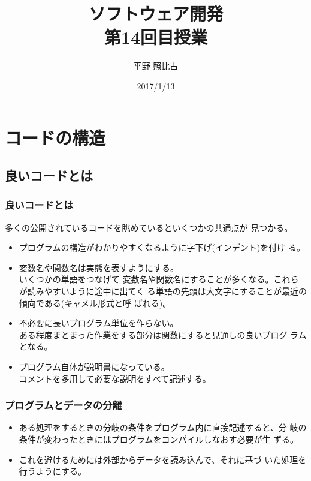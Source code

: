 
\title{ソフトウェア開発\\第14回目授業}
\author{平野 照比古}
\institute{}
\date{2017/1/13}
\newtheorem{Prob}{解説}
\newcommand{\Elm}[1]{\texttt{<#1>}}

\newcommand{\DOMM}{\texttt}
\newcommand{\Event}{\texttt}
\newcommand{\DOMP}{\texttt}
\newcommand{\DOM}{\texttt{DOM}}
\newcommand{\keyitem}{\relax}
\newcommand{\HTML}{HTML文書}

\frame{\maketitle}
\section{コードの構造}
\subsection{良いコードとは}
 \begin{frame}[containsverbatim]
  \frametitle{良いコードとは}
多くの公開されているコードを眺めているといくつかの共通点が
  見つかる。
\begin{itemize}
 \item プログラムの構造がわかりやすくなるように字下げ(インデント)を付け
			 る。
 \item 変数名や関数名は実態を表すようにする。\\いくつかの単語をつなげて
			 変数名や関数名にすることが多くなる。これらが読みやすいように途中に出てく
			 る単語の先頭は大文字にすることが最近の傾向である(キャメル形式と呼
			 ばれる)。
 \item 不必要に長いプログラム単位を作らない。\\
			 ある程度まとまった作業をする部分は関数にすると見通しの良いプログ
			 ラムとなる。
 \item プログラム自体が説明書になっている。\\
			 コメントを多用して必要な説明をすべて記述する。
\end{itemize}
 \end{frame}
 \begin{frame}[containsverbatim]
  \frametitle{プログラムとデータの分離}
  \begin{itemize}
   \item ある処理をするときの分岐の条件をプログラム内に直接記述すると、分
			 岐の条件が変わったときにはプログラムをコンパイルしなおす必要が生
         ずる。
   \item これを避けるためには外部からデータを読み込んで、それに基づ
			 いた処理を行うようにする。

  \end{itemize}
 \end{frame}
